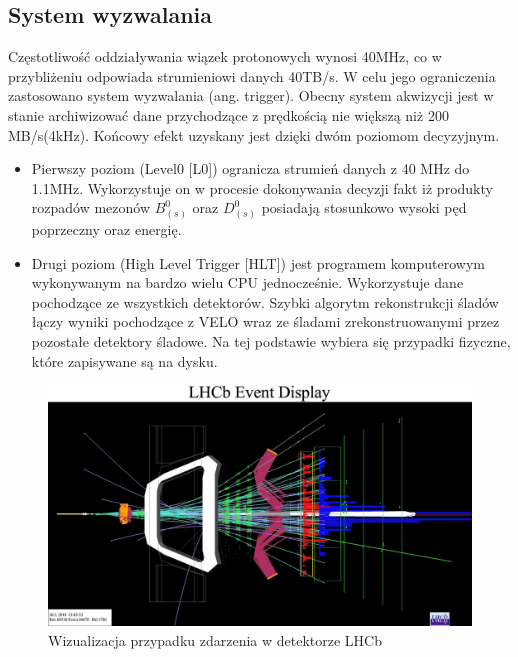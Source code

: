 \subsection{System wyzwalania}
Częstotliwość oddziaływania wiązek protonowych wynosi 40MHz, co w przybliżeniu odpowiada strumieniowi danych 40TB/s. W celu jego ograniczenia zastosowano system wyzwalania (ang. trigger). Obecny system akwizycji jest w stanie archiwizować dane przychodzące z prędkością nie większą niż 200 MB/s(4kHz). Końcowy efekt uzyskany jest dzięki dwóm poziomom decyzyjnym.
\begin{itemize}
 \item Pierwszy poziom (Level0 [L0]) ogranicza  strumień danych z 40 MHz do 1.1MHz. Wykorzystuje on w procesie dokonywania decyzji fakt iż produkty rozpadów mezonów $B_{(s)}^0$ oraz $D_{(s)}^0$ posiadają stosunkowo wysoki pęd poprzeczny oraz energię. 
 \item Drugi poziom (High Level Trigger [HLT]) jest programem komputerowym wykonywanym na bardzo wielu CPU jednocześnie. Wykorzystuje dane pochodzące ze wszystkich detektorów. Szybki algorytm rekonstrukcji śladów łączy wyniki pochodzące z VELO wraz ze śladami zrekonstruowanymi przez pozostałe detektory śladowe. Na tej podstawie wybiera się przypadki fizyczne, które zapisywane są na dysku.  
\end{itemize}
\begin{figure}[ht]
  \centering
  \includegraphics[scale=0.4]{rozdzial2/event.jpg}
  \caption{Wizualizacja przypadku zdarzenia w detektorze LHCb\cite{event}}
  \label{fig:event}
\end{figure}
